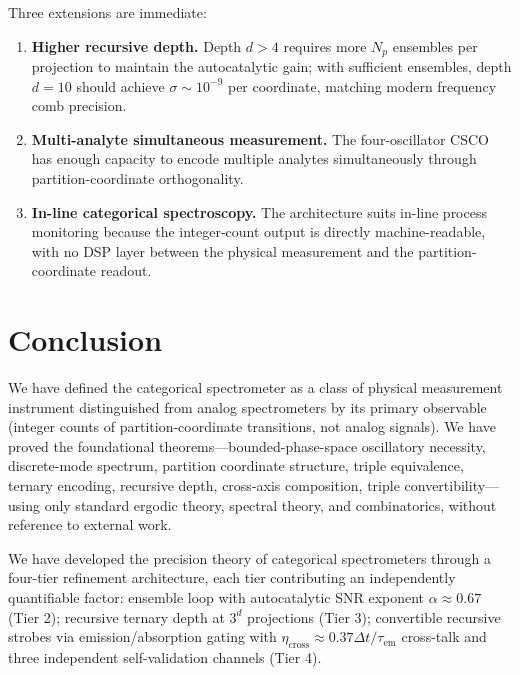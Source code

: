 \documentclass[twocolumn,11pt,a4paper]{article}
\theoremstyle{thmstyle}
\theoremstyle{axiomstyle}
\theoremstyle{definition}
\theoremstyle{remark}
\begin{document}
Three extensions are immediate:
\begin{enumerate}[nosep]
\item \textbf{Higher recursive depth.} Depth $d>4$ requires more $N_{p}$ ensembles per projection to maintain the autocatalytic gain; with sufficient ensembles, depth $d=10$ should achieve $\sigma\sim 10^{-9}$ per coordinate, matching modern frequency comb precision.
\item \textbf{Multi-analyte simultaneous measurement.} The four-oscillator CSCO has enough capacity to encode multiple analytes simultaneously through partition-coordinate orthogonality.
\item \textbf{In-line categorical spectroscopy.} The architecture suits in-line process monitoring because the integer-count output is directly machine-readable, with no DSP layer between the physical measurement and the partition-coordinate readout.
\end{enumerate}



\section*{Conclusion}

We have defined the categorical spectrometer as a class of physical measurement instrument distinguished from analog spectrometers by its primary observable (integer counts of partition-coordinate transitions, not analog signals). We have proved the foundational theorems---bounded-phase-space oscillatory necessity, discrete-mode spectrum, partition coordinate structure, triple equivalence, ternary encoding, recursive depth, cross-axis composition, triple convertibility---using only standard ergodic theory, spectral theory, and combinatorics, without reference to external work.

We have developed the precision theory of categorical spectrometers through a four-tier refinement architecture, each tier contributing an independently quantifiable factor: ensemble loop with autocatalytic SNR exponent $\alpha\approx 0.67$ (Tier 2); recursive ternary depth at $3^{d}$ projections (Tier 3); convertible recursive strobes via emission/absorption gating with $\eta_{\mathrm{cross}}\approx 0.37\Delta t/\tau_{\mathrm{em}}$ cross-talk and three independent self-validation channels (Tier 4).
\end{document}
